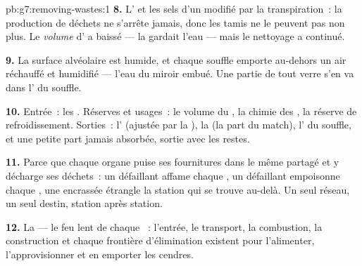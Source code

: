 \begin{solution}{pb:g7:removing-wastes:1}
\textbf{8.} L' et les sels d'un  modifié par la
transpiration~: la production de déchets ne s'arrête jamais, donc
les tamis ne le peuvent pas non plus. Le \emph{volume} d' a
baissé --- la  gardait l'eau --- mais le nettoyage a
continué.

\textbf{9.} La surface alvéolaire est humide, et chaque souffle
emporte au-dehors un air réchauffé et humidifié --- l'eau du miroir
embué. Une partie de tout verre s'en va dans l' du souffle.

\textbf{10.} Entrée~: les . Réserves et usages~: le volume
du , la chimie des , la réserve de refroidissement.
Sorties~: l' (ajustée par la ), la  (la part
du match), l' du souffle, et une petite part jamais
absorbée, sortie avec les restes.

\textbf{11.} Parce que chaque organe puise ses fournitures dans le
même  partagé et y décharge ses déchets~: un  défaillant
affame chaque , un  défaillant empoisonne chaque ,
une  encrassée étrangle la station qui se trouve au-delà. Un
seul réseau, un seul destin, station après station.

\textbf{12.} La  --- le feu lent de chaque ~:
l'entrée, le transport, la combustion, la construction et chaque
frontière d'élimination existent pour l'alimenter, l'approvisionner
et en emporter les cendres.
\end{solution}
